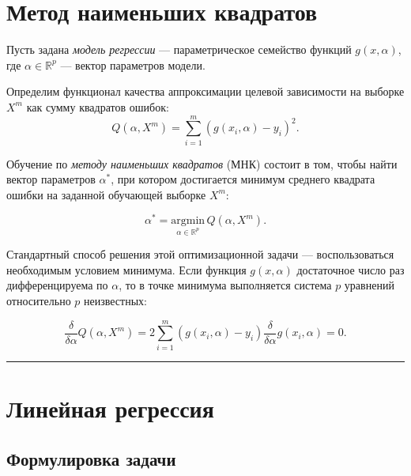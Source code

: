 \documentclass[11pt,a4paper]{article}
\renewcommand{\linethickness}{0.1ex}
\begin{document}
    \hypertarget{ux43cux435ux442ux43eux434-ux43dux430ux438ux43cux435ux43dux44cux448ux438ux445-ux43aux432ux430ux434ux440ux430ux442ux43eux432}{%
\section{Метод наименьших
квадратов}\label{ux43cux435ux442ux43eux434-ux43dux430ux438ux43cux435ux43dux44cux448ux438ux445-ux43aux432ux430ux434ux440ux430ux442ux43eux432}}

Пусть задана \emph{модель регрессии} --- параметрическое семейство
функций \(g(x,\alpha)\), где \(\alpha \in \mathbb{R}^p\) --- вектор
параметров модели.

Определим функционал качества аппроксимации целевой зависимости на
выборке \(X^m\) как сумму квадратов ошибок:
\[ Q(\alpha, X^m) = \sum_{i=1}^m \left( g(x_i, \alpha) - y_i \right)^2. \]

Обучение по \emph{методу наименьших квадратов} (МНК) состоит в том,
чтобы найти вектор параметров \(\alpha^*\), при котором достигается
минимум среднего квадрата ошибки на заданной обучающей выборке \(X^m\):

\[ \alpha^* = \underset{\alpha \in \mathbb{R}^p}{\mathrm{argmin}} \, {Q(\alpha, X^m)}. \]

Стандартный способ решения этой оптимизационной задачи ---
воспользоваться необходимым условием минимума. Если функция
\(g(x, \alpha)\) достаточное число раз дифференцируема по \(\alpha\), то
в точке минимума выполняется система \(p\) уравнений относительно \(p\)
неизвестных:

\[ \frac{\delta}{\delta \alpha} Q(\alpha, X^m) = 2 \sum_{i=1}^{m} \left( g(x_i, \alpha) -y_i \right) \frac{\delta}{\delta \alpha} g(x_i, \alpha) = 0. \]

    \begin{center}\rule{0.5\linewidth}{\linethickness}\end{center}

    \hypertarget{ux43bux438ux43dux435ux439ux43dux430ux44f-ux440ux435ux433ux440ux435ux441ux441ux438ux44f}{%
\section{Линейная
регрессия}\label{ux43bux438ux43dux435ux439ux43dux430ux44f-ux440ux435ux433ux440ux435ux441ux441ux438ux44f}}

\hypertarget{ux444ux43eux440ux43cux443ux43bux438ux440ux43eux432ux43aux430-ux437ux430ux434ux430ux447ux438}{%
\subsection{Формулировка
задачи}\label{ux444ux43eux440ux43cux443ux43bux438ux440ux43eux432ux43aux430-ux437ux430ux434ux430ux447ux438}}
\end{document}
